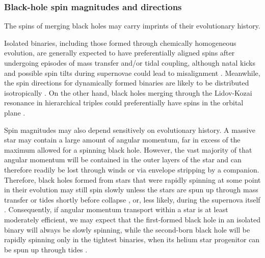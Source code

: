 \documentclass[review]{elsarticle}
\begin{document}
\subsubsection{Black-hole spin magnitudes and directions}\label{BHspins}
The spins of merging black holes may carry imprints of their evolutionary history. 

Isolated binaries, including those formed through chemically homogeneous evolution, are generally expected to have preferentially aligned spins after undergoing episodes of mass transfer and/or tidal coupling, although natal kicks and possible spin tilts during supernovae could lead to misalignment \citep[e.g.,][]{Farr:2011,Tauris:2017}.  Meanwhile, the spin directions for dynamically formed binaries are likely to be distributed isotropically \citep[e.g.,][]{Rodriguez:2016spin}.  On the other hand, black holes merging through the Lidov-Kozai resonance in hierarchical triples could preferentially have spins in the orbital plane \citep{LiuLai:2018,RodriguezAntonini:2018}.

Spin magnitudes may also depend sensitively on evolutionary history.  A massive star may contain a large amount of angular momentum, far in excess of the maximum allowed for a spinning black hole. However, the vast majority of that angular momentum will be contained in the outer layers of the star and can therefore readily be lost through winds or via envelope stripping by a companion.  Therefore, black holes formed from stars that were rapidly spinning at some point in their evolution may still spin slowly unless the stars are spun up through mass transfer or tides shortly before collapse \citep{Kushnir:2016,HotokezakaPiran:2017,Zaldarriaga:2017}, or, less likely, during the supernova itself \citep{Batta:2017,Schroeder:2018}.   Consequently, if angular momentum transport within a star is at least moderately efficient, we may expect that the first-formed black hole in an isolated binary will always be slowly spinning, while the second-born black hole will be rapidly spinning only in the tightest binaries, when its helium star progenitor can be spun up through tides \citep{Bavera:2019,Belczynski:2020,MandelFragos:2020,Bavera:2021,OlejakBelczynski:2021}.
\end{document}

